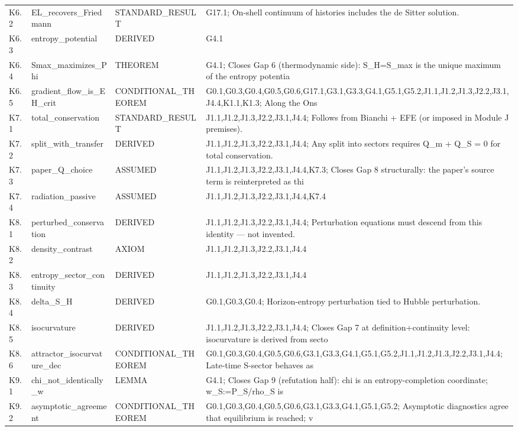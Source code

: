 \documentclass[11pt,a4paper]{article}
\theoremstyle{remark}\newtheorem*{caution}{Caution}
\begin{document}
{\begin{longtable}{@{}p{2.1cm}p{3.1cm}p{2.6cm}p{6cm}@{}}
K6.2 & EL\_recovers\_Friedmann & STANDARD\_RESULT & G17.1; On-shell continuum of histories includes the de Sitter solution. \\
K6.3 & entropy\_potential & DERIVED & G4.1 \\
K6.4 & Smax\_maximizes\_Phi & THEOREM & G4.1; Closes Gap 6 (thermodynamic side): S\_H=S\_max is the unique maximum of the entropy potentia \\
K6.5 & gradient\_flow\_is\_EH\_crit & CONDITIONAL\_THEOREM & G0.1,G0.3,G0.4,G0.5,G0.6,G17.1,G3.1,G3.3,G4.1,G5.1,G5.2,J1.1,J1.2,J1.3,J2.2,J3.1,J4.4,K1.1,K1.3; Along the Ons \\
K7.1 & total\_conservation & STANDARD\_RESULT & J1.1,J1.2,J1.3,J2.2,J3.1,J4.4; Follows from Bianchi + EFE (or imposed in Module J premises). \\
K7.2 & split\_with\_transfer & DERIVED & J1.1,J1.2,J1.3,J2.2,J3.1,J4.4; Any split into sectors requires Q\_m + Q\_S = 0 for total conservation. \\
K7.3 & paper\_Q\_choice & ASSUMED & J1.1,J1.2,J1.3,J2.2,J3.1,J4.4,K7.3; Closes Gap 8 structurally: the paper's source term is reinterpreted as thi \\
K7.4 & radiation\_passive & ASSUMED & J1.1,J1.2,J1.3,J2.2,J3.1,J4.4,K7.4 \\
K8.1 & perturbed\_conservation & DERIVED & J1.1,J1.2,J1.3,J2.2,J3.1,J4.4; Perturbation equations must descend from this identity — not invented. \\
K8.2 & density\_contrast & AXIOM & J1.1,J1.2,J1.3,J2.2,J3.1,J4.4 \\
K8.3 & entropy\_sector\_continuity\ & DERIVED & J1.1,J1.2,J1.3,J2.2,J3.1,J4.4 \\
K8.4 & delta\_S\_H & DERIVED & G0.1,G0.3,G0.4; Horizon-entropy perturbation tied to Hubble perturbation. \\
K8.5 & isocurvature & DERIVED & J1.1,J1.2,J1.3,J2.2,J3.1,J4.4; Closes Gap 7 at definition+continuity level: isocurvature is derived from secto \\
K8.6 & attractor\_isocurvature\_dec & CONDITIONAL\_THEOREM & G0.1,G0.3,G0.4,G0.5,G0.6,G3.1,G3.3,G4.1,G5.1,G5.2,J1.1,J1.2,J1.3,J2.2,J3.1,J4.4; Late-time S-sector behaves as \\
K9.1 & chi\_not\_identically\_w & LEMMA & G4.1; Closes Gap 9 (refutation half): chi is an entropy-completion coordinate; w\_S:=P\_S/rho\_S is \\
K9.2 & asymptotic\_agreement & CONDITIONAL\_THEOREM & G0.1,G0.3,G0.4,G0.5,G0.6,G3.1,G3.3,G4.1,G5.1,G5.2; Asymptotic diagnostics agree that equilibrium is reached; v \\

\end{longtable}}
\end{document}

